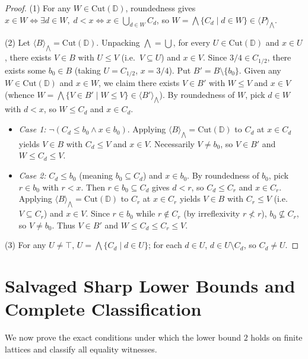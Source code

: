 \documentclass[11pt,a4paper]{article}
\theoremstyle{definition}
\theoremstyle{remark}
\begin{document}
\begin{proof}
(1) For any $W \in \mathrm{Cut}(\mathbb{D})$, roundedness gives $x \in W \iff \exists d \in W,\; d < x \iff x \in \bigcup_{d \in W} C_d$, so $W = \bigwedge \{ C_d \mid d \in W \} \in \langle P \rangle_{\bigwedge}$.

(2) Let $\langle B \rangle_{\bigwedge} = \mathrm{Cut}(\mathbb{D})$. Unpacking $\bigwedge = \bigcup$, for every $U \in \mathrm{Cut}(\mathbb{D})$ and $x \in U$, there exists $V \in B$ with $U \le V$ (i.e.\ $V \subseteq U$) and $x \in V$. Since $3/4 \in C_{1/2}$, there exists some $b_0 \in B$ (taking $U = C_{1/2}$, $x = 3/4$). Put $B' = B \setminus \{b_0\}$. Given any $W \in \mathrm{Cut}(\mathbb{D})$ and $x \in W$, we claim there exists $V \in B'$ with $W \le V$ and $x \in V$ (whence $W = \bigwedge \{ V \in B' \mid W \le V \} \in \langle B' \rangle_{\bigwedge}$). By roundedness of $W$, pick $d \in W$ with $d < x$, so $W \le C_d$ and $x \in C_d$.
\begin{itemize}
\item \emph{Case 1:} $\neg (C_d \le b_0 \land x \in b_0)$. Applying $\langle B \rangle_{\bigwedge} = \mathrm{Cut}(\mathbb{D})$ to $C_d$ at $x \in C_d$ yields $V \in B$ with $C_d \le V$ and $x \in V$. Necessarily $V \neq b_0$, so $V \in B'$ and $W \le C_d \le V$.
\item \emph{Case 2:} $C_d \le b_0$ (meaning $b_0 \subseteq C_d$) and $x \in b_0$. By roundedness of $b_0$, pick $r \in b_0$ with $r < x$. Then $r \in b_0 \subseteq C_d$ gives $d < r$, so $C_d \le C_r$ and $x \in C_r$. Applying $\langle B \rangle_{\bigwedge} = \mathrm{Cut}(\mathbb{D})$ to $C_r$ at $x \in C_r$ yields $V \in B$ with $C_r \le V$ (i.e.\ $V \subseteq C_r$) and $x \in V$. Since $r \in b_0$ while $r \notin C_r$ (by irreflexivity $r \not< r$), $b_0 \not\subseteq C_r$, so $V \neq b_0$. Thus $V \in B'$ and $W \le C_d \le C_r \le V$.
\end{itemize}

(3) For any $U \neq \top$, $U = \bigwedge \{ C_d \mid d \in U \}$; for each $d \in U$, $d \in U \setminus C_d$, so $C_d \neq U$.
\end{proof}

\section{Salvaged Sharp Lower Bounds and Complete Classification}

We now prove the exact conditions under which the lower bound $2$ holds on finite lattices and classify all equality witnesses.
\end{document}

